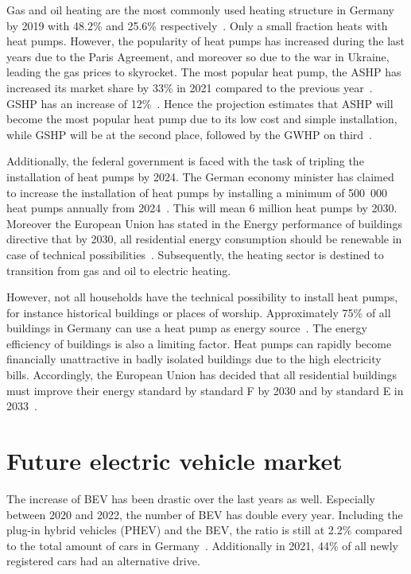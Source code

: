Gas and oil heating are the most commonly used heating structure in Germany by 2019 with 48.2\% and 25.6\% respectively~\cite{BundesministeriumfürWirtschaftundKlimaschutz_2019}. Only a small fraction heats with heat pumps. However, the popularity of heat pumps has increased during the last years due to the Paris Agreement, and moreover so due to the war in Ukraine, leading the gas prices to skyrocket. The most popular heat pump, the ASHP has increased its market share by 33\% in 2021 compared to the previous year~\cite{BWP_2022}.
GSHP has an increase of 12\%~\cite{BWP_2022}. Hence the projection estimates that ASHP will become the most popular heat pump due to its low cost and simple installation, while GSHP will be at the second place, followed by the GWHP on third~\cite{marekmiara}.

Additionally, the federal government is faced with the task of tripling the installation of heat pumps by 2024. The German economy minister has claimed to increase the installation of heat pumps by installing a minimum of 500~000 heat pumps annually from 2024~\cite{tagesschaude_2022}. This will mean 6 million heat pumps by 2030. Moreover the European Union has stated in the Energy performance of buildings directive that by 2030, all residential energy consumption should be renewable in case of technical possibilities~\cite{EPBD_2021}. Subsequently, the heating sector is destined to transition from gas and oil to electric heating.

However, not all households have the technical possibility to install heat pumps, for instance historical buildings or places of worship. Approximately 75\% of all buildings in Germany can use a heat pump as energy source~\cite{agoraWP}. The energy efficiency of buildings is also a limiting factor. Heat pumps can rapidly become financially unattractive in badly isolated buildings due to the high electricity bills. Accordingly, the European Union has decided that all residential buildings must improve their energy standard by standard F by 2030 and by standard E in 2033~\cite{EPBD_2021}.

\section{Future electric vehicle market}

The increase of BEV has been drastic over the last years as well. Especially between 2020 and 2022, the number of BEV has double every year. Including the plug-in hybrid vehicles (PHEV) and the BEV, the ratio is still at 2.2\% compared to the total amount of cars in Germany~\cite{Kraftfahrzeugbundesamt_2022}. Additionally in 2021, 44\% of all newly registered cars had an alternative drive. 

